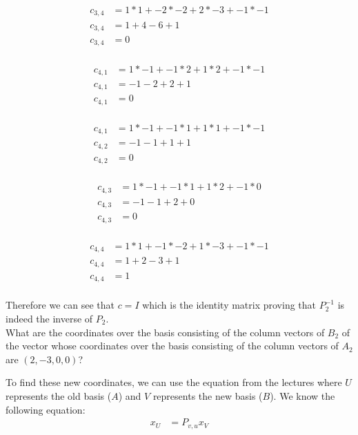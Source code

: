 \documentclass[12pt]{article}
\begin{document}
\begin{itemize}
\begin{align*}
    c_{3,4} &= 1 * 1 + -2 * -2 + 2 * -3 + -1 * -1 \\
    c_{3,4} &= 1 + 4 - 6 + 1 \\
    c_{3,4} &= 0  \\
\end{align*}

\begin{align*}
    c_{4,1} &= 1 * -1 + -1 * 2 + 1 * 2 + -1 * -1 \\
    c_{4,1} &= -1 - 2 + 2 + 1 \\
    c_{4,1} &= 0  \\
\end{align*}

\begin{align*}
    c_{4,1} &= 1 * -1 + -1 * 1 + 1 * 1 + -1 * -1 \\
    c_{4,2} &= -1 - 1 + 1 + 1 \\
    c_{4,2} &= 0  \\
\end{align*}

\begin{align*}
    c_{4,3} &= 1 * -1 + -1 * 1 + 1 * 2 + -1 * 0 \\
    c_{4,3} &= -1 - 1 + 2 + 0 \\
    c_{4,3} &= 0  \\
\end{align*}

\begin{align*}
    c_{4,4} &= 1 * 1 + -1 * -2 + 1 * -3 + -1 * -1 \\
    c_{4,4} &= 1 + 2 - 3 + 1 \\
    c_{4,4} &= 1  \\
\end{align*}

Therefore we can see that $c=I$ which is the identity matrix proving that $P_2^{-1}$ is indeed the inverse of $P_2$. \\

What are the coordinates over the basis consisting of the column vectors of $B_2$ of the vector whose coordinates over the basis  consisting of the column vectors of $A_2$ are $(2, -3, 0, 0)$?
\end{itemize}

To find these new coordinates, we can use the equation from the lectures where $U$ represents the old basis ($A$) and $V$ represents the new basis ($B$). We know the following equation: \\
\begin{align*}
    x_U &= P_{v,u}x_V \\
\end{align*}
\end{document}

